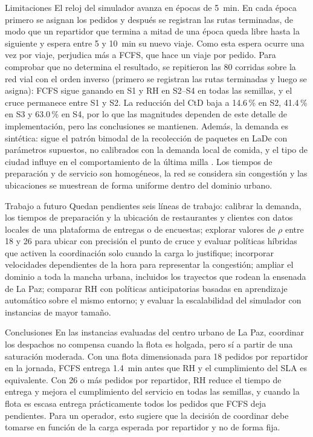 \documentclass[10pt]{article}
\makeatletter
\renewcommand{\section}{\@startsection{section}{1}{0pt}{8pt}{0.1pt}
  {\semibold\fontsize{12}{14.6}\selectfont\color{riimazul}\raggedright}}
\renewcommand{\subsection}{\@startsection{subsection}{2}{0pt}{8pt}{0.1pt}
  {\semibold\itshape\fontsize{11}{13.4}\selectfont\addfontfeatures{LetterSpace=6.8}\raggedright}}
\makeatother
\begin{document}
\subsection{Limitaciones}
El reloj del simulador avanza en épocas de 5~min. En cada época primero se asignan los pedidos y
después se registran las rutas terminadas, de modo que un repartidor que termina a mitad de una época
queda libre hasta la siguiente y espera entre 5 y 10~min su nuevo viaje. Como esta espera ocurre una
vez por viaje, perjudica más a FCFS, que hace un viaje por pedido. Para comprobar que no determina el
resultado, se repitieron las 80 corridas sobre la red vial con el orden inverso (primero se registran
las rutas terminadas y luego se asigna): FCFS sigue ganando en S1 y RH en S2--S4 en todas las
semillas, y el cruce permanece entre S1 y S2. La reducción del CtD baja a 14.6\,\% en S2, 41.4\,\% en
S3 y 63.0\,\% en S4, por lo que las magnitudes dependen de este detalle de implementación, pero las
conclusiones se mantienen. Además, la demanda es
sintética: sigue el patrón bimodal de la recolección de paquetes en LaDe con parámetros supuestos, no
calibrados con la demanda local de comida, y el tipo de ciudad influye en el
comportamiento de la última milla \cite{MunozVillamizar2021}. Los tiempos de preparación y de
servicio son homogéneos, la red se considera sin congestión y las ubicaciones se muestrean de forma
uniforme dentro del dominio urbano.

\section{Trabajo a futuro}
Quedan pendientes seis líneas de trabajo: calibrar la demanda, los tiempos de preparación y la
ubicación de restaurantes y clientes con datos locales de una plataforma de entregas o de encuestas;
explorar valores de $\rho$ entre 18 y 26 para ubicar con precisión el punto de cruce y evaluar
políticas híbridas que activen la coordinación solo cuando la carga lo justifique; incorporar
velocidades dependientes de la hora para representar la congestión; ampliar el dominio a toda la
mancha urbana, incluidos los trayectos que rodean la ensenada de La Paz; comparar RH con políticas
anticipatorias basadas en aprendizaje automático sobre el mismo entorno; y evaluar la escalabilidad
del simulador con instancias de mayor tamaño.

\section{Conclusiones}
En las instancias evaluadas del centro urbano de La Paz, coordinar los despachos no compensa cuando
la flota es holgada, pero sí a partir de una saturación moderada. Con una flota dimensionada para 18
pedidos por repartidor en la jornada, FCFS entrega 1.4~min antes que RH y el cumplimiento del SLA es
equivalente. Con 26 o más pedidos por repartidor, RH reduce el tiempo de entrega y mejora el
cumplimiento del servicio en todas las semillas, y cuando la flota es escasa entrega prácticamente
todos los pedidos que FCFS deja pendientes. Para un operador, esto sugiere que la decisión de
coordinar debe tomarse en función de la carga esperada por repartidor y no de forma fija.
\end{document}
